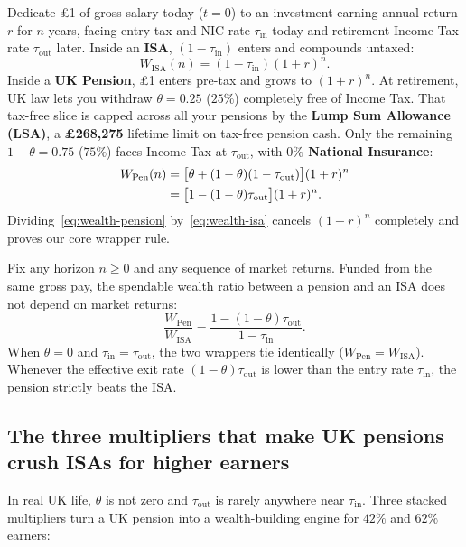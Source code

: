 Dedicate
 \pounds 1 of gross salary today ($t = 0$) to an investment earning annual return $r$ for $n$ years, facing entry tax-and-NIC rate $\tau_{\text{in}}$ today and retirement Income Tax rate $\tau_{\text{out}}$ later. Inside an \textbf{ISA}, $(1 - \tau_{\text{in}})$ enters and compounds untaxed:
\begin{equation}
  W_{\text{ISA}}(n) = (1 - \tau_{\text{in}})(1 + r)^n.
  \label{eq:wealth-isa}
\end{equation}
Inside a \textbf{UK Pension}, \pounds 1 enters pre-tax and grows to $(1 + r)^n$. At retirement, UK law lets you withdraw $\theta = 0.25$ (\textbf{$25\%$}) completely free of Income Tax. That tax-free slice is capped across all your pensions by the \textbf{Lump Sum Allowance (LSA)}, a \textbf{\pounds 268,275} lifetime limit on tax-free pension cash. Only the remaining $1 - \theta = 0.75$ ($75\%$) faces Income Tax at $\tau_{\text{out}}$, with \textbf{$0\%$ National Insurance}:
\begin{align}
  W_{\text{Pen}}(n) &= \bigl[\theta + (1 - \theta)(1 - \tau_{\text{out}})\bigr](1 + r)^n \notag \\
  &= \bigl[1 - (1 - \theta)\tau_{\text{out}}\bigr](1 + r)^n.
  \label{eq:wealth-pension}
\end{align}
Dividing~\eqref{eq:wealth-pension} by~\eqref{eq:wealth-isa} cancels $(1 + r)^n$ completely and proves our core wrapper rule.

\begin{theorem}
\label{thm:wrapper-equivalence}
Fix any horizon $n \ge 0$ and any sequence of market returns. Funded from the same gross pay, the spendable wealth ratio between a pension and an ISA does not depend on market returns:
\[
  \frac{W_{\text{Pen}}}{W_{\text{ISA}}} = \frac{1 - (1 - \theta)\tau_{\text{out}}}{1 - \tau_{\text{in}}}.
\]
When $\theta = 0$ and $\tau_{\text{in}} = \tau_{\text{out}}$, the two wrappers tie identically ($W_{\text{Pen}} = W_{\text{ISA}}$). Whenever the effective exit rate $(1 - \theta)\tau_{\text{out}}$ is lower than the entry rate $\tau_{\text{in}}$, the pension strictly beats the ISA.
\end{theorem}

\subsection{The three multipliers that make UK pensions crush ISAs for higher earners}

In real UK life, $\theta$ is not zero and $\tau_{\text{out}}$ is rarely anywhere near $\tau_{\text{in}}$. Three stacked multipliers turn a UK pension into a wealth-building engine for $42\%$ and $62\%$ earners:

